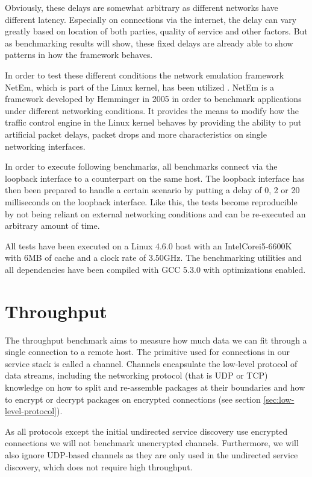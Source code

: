 Obviously, these delays are somewhat arbitrary as different networks have different latency.
Especially on connections via the internet, the delay can vary greatly based on location of both parties, quality of service and other factors.
But as benchmarking results will show, these fixed delays are already able to show patterns in how the framework behaves.

In order to test these different conditions the network emulation framework NetEm, which is part of the Linux kernel, has been utilized \cite{hemminger2005network}.
NetEm is a framework developed by Hemminger in 2005 in order to benchmark applications under different networking conditions.
It provides the means to modify how the traffic control engine in the Linux kernel behaves by providing the ability to put artificial packet delays, packet drops and more characteristics on single networking interfaces.

In order to execute following benchmarks, all benchmarks connect via the loopback interface to a counterpart on the same host.
The loopback interface has then been prepared to handle a certain scenario by putting a delay of 0, 2 or 20 milliseconds on the loopback interface.
Like this, the tests become reproducible by not being reliant on external networking conditions and can be re-executed an arbitrary amount of time.

\medskip

All tests have been executed on a Linux 4.6.0 host with an Intel\textregistered Core\texttrademark i5-6600K with 6MB of cache and a clock rate of 3.50GHz.
The benchmarking utilities and all dependencies have been compiled with GCC 5.3.0 with optimizations enabled.

\section{Throughput}

The throughput benchmark aims to measure how much data we can fit through a single connection to a remote host.
The primitive used for connections in our service stack is called a channel.
Channels encapsulate the low-level protocol of data streams, including the networking protocol (that is UDP or TCP) knowledge on how to split and re-assemble packages at their boundaries and how to encrypt or decrypt packages on encrypted connections (see section \ref{sec:low-level-protocol}).

As all protocols except the initial undirected service discovery use encrypted connections we will not benchmark unencrypted channels.
Furthermore, we will also ignore UDP-based channels as they are only used in the undirected service discovery, which does not require high throughput.

